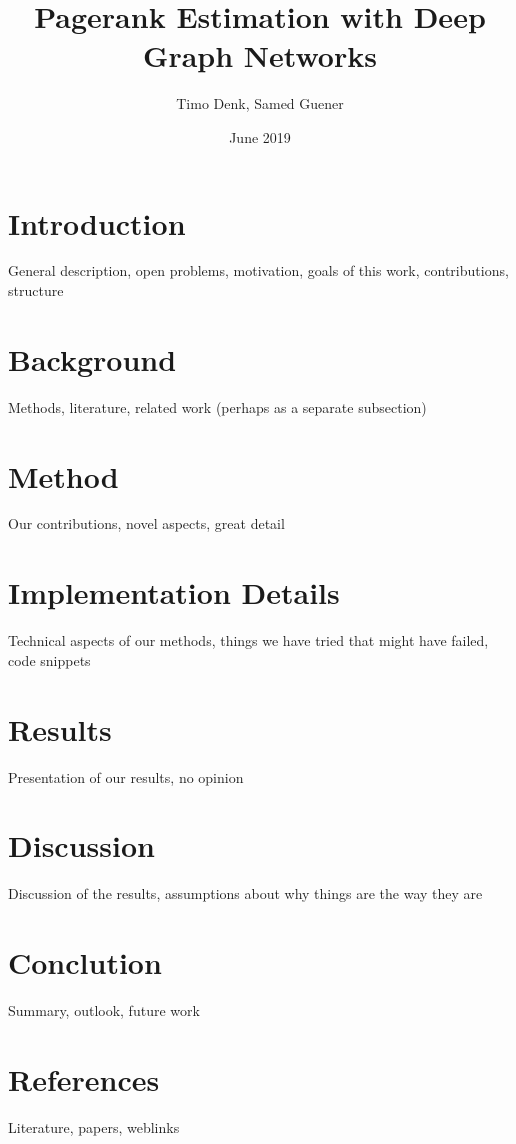 \documentclass{article}
\title{Pagerank Estimation with Deep Graph Networks}
\author{Timo Denk, Samed Guener}
\date{June 2019}
\begin{document}
\maketitle

\section{Introduction}
General description, open problems, motivation, goals of this work, contributions, structure

\section{Background}
Methods, literature, related work (perhaps as a separate subsection)

\section{Method}
Our contributions, novel aspects, great detail

\section{Implementation Details}
Technical aspects of our methods, things we have tried that might have failed, code snippets

\section{Results}
Presentation of our results, no opinion

\section{Discussion}
Discussion of the results, assumptions about why things are the way they are

\section{Conclution}
Summary, outlook, future work

\section{References}
Literature, papers, weblinks
\end{document}
